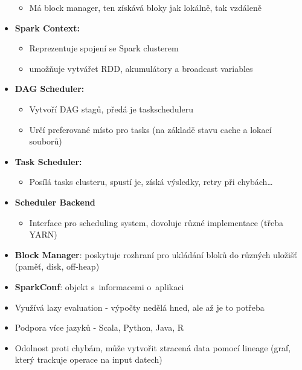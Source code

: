 \begin{itemize}
    \begin{itemize}
        \item Má block manager, ten získává bloky jak lokálně, tak vzdáleně
    \end{itemize}
    \item \textbf{Spark Context:}
    \begin{itemize}
        \item Reprezentuje spojení se Spark clusterem
        \item umožňuje vytvářet RDD, akumulátory a broadcast variables
    \end{itemize}
    \item \textbf{DAG Scheduler:}
    \begin{itemize}
        \item Vytvoří DAG stagů, předá je taskscheduleru
        \item Určí preferované místo pro tasks (na základě stavu cache a lokací souborů)
    \end{itemize}
    \item \textbf{Task Scheduler:}
    \begin{itemize}
        \item Posílá tasks clusteru, spustí je, získá výsledky, retry při chybách\dots
    \end{itemize}
    \item \textbf{Scheduler Backend}
    \begin{itemize}
        \item Interface pro scheduling system, dovoluje různé implementace (třeba YARN)
    \end{itemize}
    \item \textbf{Block Manager}: poskytuje rozhraní pro ukládání bloků do různých uložišť (paměť, disk, off-heap)
    \item \textbf{SparkConf}: objekt s~informacemi o~aplikaci
    \item Využívá lazy evaluation - výpočty nedělá hned, ale až je to potřeba
    \item Podpora více jazyků - Scala, Python, Java, R
    \item Odolnost proti chybám, může vytvořit ztracená data pomocí lineage (graf, který trackuje operace na input datech)
\end{itemize}
